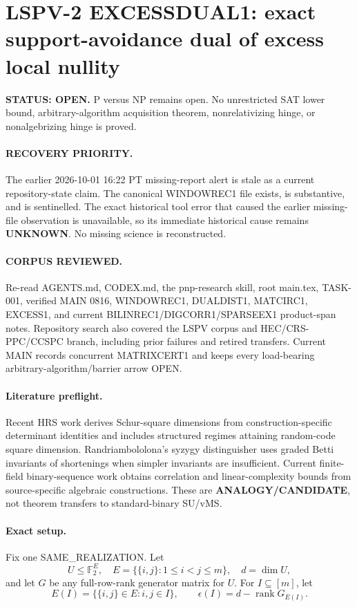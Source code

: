 \documentclass[11pt]{article}
\begin{document}
\section*{LSPV-2 EXCESSDUAL1: exact support-avoidance dual of excess local nullity}
\textbf{STATUS: OPEN.} P versus NP remains open. No unrestricted SAT lower bound, arbitrary-algorithm acquisition theorem, nonrelativizing hinge, or nonalgebrizing hinge is proved.

\paragraph{RECOVERY PRIORITY.}
The earlier 2026-10-01 16:22 PT missing-report alert is stale as a current repository-state claim. The canonical WINDOWREC1 file exists, is substantive, and is sentinelled. The exact historical tool error that caused the earlier missing-file observation is unavailable, so its immediate historical cause remains \textbf{UNKNOWN}. No missing science is reconstructed.

\paragraph{CORPUS REVIEWED.}
Re-read AGENTS.md, CODEX.md, the pnp-research skill, root main.tex, TASK-001, verified MAIN 0816, WINDOWREC1, DUALDIST1, MATCIRC1, EXCESS1, and current BILINREC1/DIGCORR1/SPARSEEX1 product-span notes. Repository search also covered the LSPV corpus and HEC/CRS-PPC/CCSPC branch, including prior failures and retired transfers. Current MAIN records concurrent MATRIXCERT1 and keeps every load-bearing arbitrary-algorithm/barrier arrow OPEN.

\paragraph{Literature preflight.}
Recent HRS work derives Schur-square dimensions from construction-specific determinant identities and includes structured regimes attaining random-code square dimension. Randriambololona's syzygy distinguisher uses graded Betti invariants of shortenings when simpler invariants are insufficient. Current finite-field binary-sequence work obtains correlation and linear-complexity bounds from source-specific algebraic constructions. These are \textbf{ANALOGY/CANDIDATE}, not theorem transfers to standard-binary SU/vMS.

\paragraph{Exact setup.}
Fix one SAME\_REALIZATION. Let
\[
U\le \mathbb F_2^{E},\quad
E=\{\{i,j\}:1\le i<j\le m\},\quad d=\dim U,
\]
and let \(G\) be any full-row-rank generator matrix for \(U\). For \(I\subseteq[m]\), let
\[
E(I)=\{\{i,j\}\in E:i,j\in I\},
\qquad
\epsilon(I)=d-\operatorname{rank}G_{E(I)}.
\]
\end{document}
